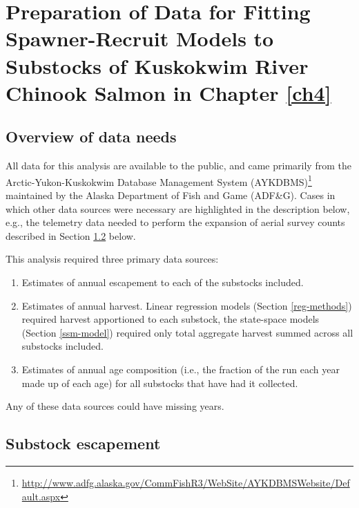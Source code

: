 \documentclass[12pt,]{book}
\let\rmarkdownfootnote\footnote%
\def\footnote{\protect\rmarkdownfootnote}
\theoremstyle{definition}
\theoremstyle{definition}
\theoremstyle{definition}
\theoremstyle{remark}
\begin{document}
\clearpage
\pagestyle{plain}

\doublespacing

\setlength{\parskip}{6pt plus 2pt minus 1pt}

\appendix


\captionsetup[figure]{list=yes} \captionsetup[table]{list=yes}

\chapter{Preparation of Data for Fitting Spawner-Recruit Models to
Substocks of Kuskokwim River Chinook Salmon in Chapter
\ref{ch4}}\label{appendix-c}

\section{Overview of data needs}\label{overview-of-data-needs}

\noindent
All data for this analysis are available to the public, and came
primarily from the Arctic-Yukon-Kuskokwim Database Management System
(AYKDBMS)\footnote{\url{http://www.adfg.alaska.gov/CommFishR3/WebSite/AYKDBMSWebsite/Default.aspx}}
maintained by the Alaska Department of Fish and Game (ADF\&G). Cases in
which other data sources were necessary are highlighted in the
description below, e.g., the telemetry data needed to perform the
expansion of aerial survey counts described in Section
\ref{air-expansion} below.

\noindent
This analysis required three primary data sources:

\begin{enumerate}
\def\labelenumi{(\arabic{enumi})}
\item
  Estimates of annual escapement to each of the substocks included.
\item
  Estimates of annual harvest. Linear regression models (Section
  \ref{reg-methods}) required harvest apportioned to each substock, the
  state-space models (Section \ref{ssm-model}) required only total
  aggregate harvest summed across all substocks included.
\item
  Estimates of annual age composition (i.e., the fraction of the run
  each year made up of each age) for all substocks that have had it
  collected.
\end{enumerate}

\noindent
Any of these data sources could have missing years.

\section{Substock escapement}\label{air-expansion}
\end{document}
